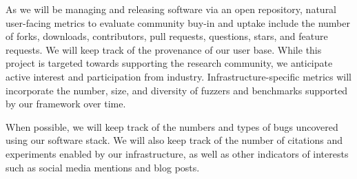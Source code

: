 
As we will be managing and releasing software via an open repository, 
natural user-facing metrics to evaluate community buy-in and uptake include the number of forks, downloads, contributors, pull requests, questions, 
stars, and feature requests. 
We will keep track of the provenance of our user base. While this project is targeted towards supporting the research community, 
we anticipate active interest and participation from industry. 
Infrastructure-specific metrics will incorporate the number, size, and diversity of fuzzers and benchmarks supported by our framework over time.

When possible, we will keep track of the numbers and types of bugs uncovered using our software stack.
We will also keep track of the number of citations and experiments enabled by our infrastructure, as well 
as other indicators of interests such as social media mentions and blog posts.
